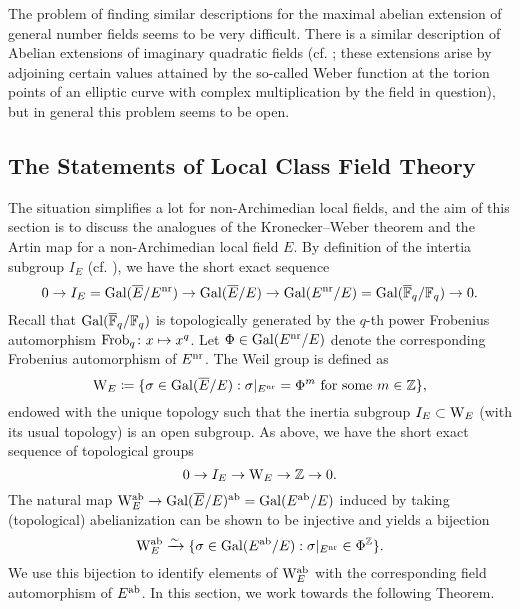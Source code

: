 \documentclass[../main.tex]{subfiles}
\begin{document}
The problem of finding similar descriptions for the maximal abelian extension of
general number fields seems to be very difficult. There is a similar description 
of Abelian extensions of imaginary quadratic fields (cf. \cite[Chapter II,
§5]{silverman1994advanced}; these extensions arise by adjoining certain values attained
by the so-called Weber function at the torion points of an elliptic curve with complex
multiplication by the field in question), but in general this problem seems to be open.

\subsection{The Statements of Local Class Field Theory} %
\label{sub:The Statements of Local Class Field Theory}

The situation simplifies a lot for non-Archimedian local fields, and
the aim of this section is to discuss the analogues of the Kronecker--Weber
theorem and the Artin map for a non-Archimedian local field $E$.
By definition of the intertia subgroup $I_E$ (cf. \cite[§1]{serre2013local}),
we have the short exact sequence
\begin{equation*}
  0 \to I_E = \operatorname{Gal}(\overline E/ E^{\mathrm{nr}}) \to \operatorname{Gal}(\overline E/E) \to \operatorname{Gal}(E^{\mathrm{nr}} /E) =
  \operatorname{Gal}(\overline {\mathbb{F}}_q /\mathbb{F}_q) \to 0.
\end{equation*}
Recall that $\operatorname{Gal}({\overline {\mathbb{F}}_q}/\mathbb{F}_q)$ is topologically generated by the $q$-th power
Frobenius automorphism $\mathrm{Frob}_q\colon x \mapsto x^q$. Let $\Phi \in \operatorname{Gal}(E^{\mathrm{nr}} /E)$ 
denote the corresponding Frobenius automorphism of $E^{\mathrm{nr}}$. 
The Weil group is defined as
\begin{equation*}
  \mathrm W_E \coloneq \{\sigma \in \operatorname{Gal}(\overline E/E) : \sigma|_{E^{\mathrm{nr}}} = \Phi^m
  \text{ for some } m \in \mathbb{Z}\},
\end{equation*}
endowed with the unique topology such that the inertia subgroup $I_E \subset
\mathrm W_E$ (with its usual topology) is an open subgroup.
As above, we have the short exact sequence of topological groups
\begin{equation*}
  0 \to I_E \to \mathrm W_E \to \mathbb{Z} \to 0.
\end{equation*}
The natural map $\mathrm W_E^{\mathrm{ab}} \to \operatorname{Gal}(\overline E/E)^{\mathrm{ab}} = \operatorname{Gal}(E^{\mathrm{ab}}/E)$ induced by taking
(topological) abelianization can be shown to be injective and yields a bijection
\begin{equation}\label{eq:WeilgroupInjectsIntoGalois}
  \mathrm W_E^{\mathrm{ab}} \xrightarrow{\sim} \{\sigma \in \operatorname{Gal}(E^{\mathrm{ab}}/E) : \sigma|_{E^{\mathrm{nr}}} \in \Phi^{\mathbb{Z}}\}.
\end{equation}
We use this bijection to identify elements of $\mathrm W_E^{\mathrm{ab}}$ with the corresponding field
automorphism of $E^{\mathrm{ab}}$. In this section, we work towards the following Theorem.
\end{document}
